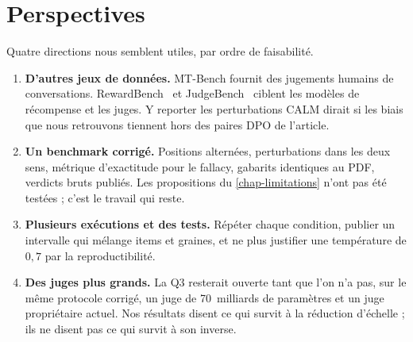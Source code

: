 \section{Perspectives}

Quatre directions nous semblent utiles, par ordre de faisabilité.

\begin{enumerate}[leftmargin=1.6em]
  \item \textbf{D'autres jeux de données.} MT-Bench \cite{zheng2023mtbench} fournit des jugements humains de conversations. RewardBench~\cite{lambert2024rewardbench} et JudgeBench~\cite{tan2025judgebench} ciblent les modèles de récompense et les juges. Y reporter les perturbations CALM dirait si les biais que nous retrouvons tiennent hors des paires DPO de l'article.
  \item \textbf{Un benchmark corrigé.} Positions alternées, perturbations dans les deux sens, métrique d'exactitude pour le fallacy, gabarits identiques au PDF, verdicts bruts publiés. Les propositions du \cref{chap-limitations} n'ont pas été testées ; c'est le travail qui reste.
  \item \textbf{Plusieurs exécutions et des tests.} Répéter chaque condition, publier un intervalle qui mélange items et graines, et ne plus justifier une température de $0{,}7$ par la reproductibilité.
  \item \textbf{Des juges plus grands.} La Q3 resterait ouverte tant que l'on n'a pas, sur le même protocole corrigé, un juge de 70~milliards de paramètres et un juge propriétaire actuel. Nos résultats disent ce qui survit à la réduction d'échelle ; ils ne disent pas ce qui survit à son inverse.
\end{enumerate}
